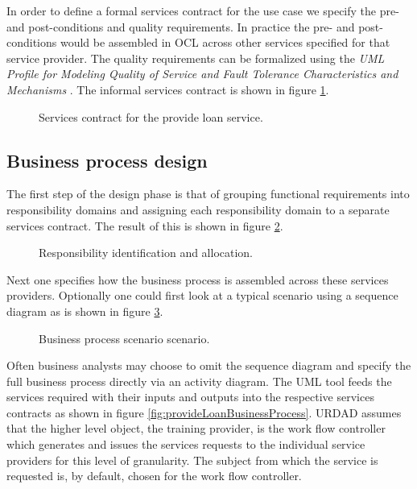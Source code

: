 In order to define a formal services contract for the use case we specify the
pre- and post-conditions and quality requirements. In practice the pre- and
post-conditions would be assembled in OCL across other services specified
for that service provider. The quality requirements can be formalized using the
{\em UML Profile for Modeling Quality of Service and Fault Tolerance Characteristics
and Mechanisms} \cite{omg:umlProfileQos}. The informal services contract is shown
in figure \ref{fig:provideLoanContract}.

\begin{figure}
  \centering
  \caption{Services contract for the provide loan service.}
  \label{fig:provideLoanContract}
\end{figure}


\subsection{Business process design}


The first step of the design phase is that of grouping functional requirements
into responsibility domains and assigning each responsibility domain to a
separate services contract. The result of this is shown in figure
\ref{fig:provideLoanResponsibilityAllocation}.

\begin{figure}
  \centering
  \caption{Responsibility identification and allocation.}
  \label{fig:provideLoanResponsibilityAllocation}
\end{figure}

Next one specifies how the business process is assembled across these services
providers. Optionally one could first look at a typical scenario using a
sequence diagram as is shown in figure
\ref{fig:provideLoanSuccessScenario}.


\begin{figure}
  \centering
  \caption{Business process scenario scenario.}
  \label{fig:provideLoanSuccessScenario}
\end{figure}

Often business analysts may choose to omit the sequence diagram and specify the
full business process directly via an activity diagram. The UML tool feeds the
services required with their inputs and outputs into the respective
services contracts as shown in figure \ref{fig:provideLoanBusinessProcess}.
URDAD assumes that the higher level object, the training
provider, is the work flow controller which generates and issues the services
requests to the individual service providers for this level of granularity. The
subject from which the service is requested is, by default, chosen for the work
flow controller.

